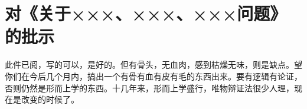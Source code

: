 \section[对《关于×××、×××、×××问题》的批示（一九六四年十二月十二日）]{对《关于×××、×××、×××问题》的批示}


此件已阅，写的可以，是好的。但有骨头，无血肉，感到枯燥无味，则是缺点。望你们在今后几个月内，搞出一个有骨有血有皮有毛的东西出来。要有逻辑有论证，否则仍然是形而上学的东西。十几年来，形而上学盛行，唯物辩证法很少人理，现在是改变的时候了。

